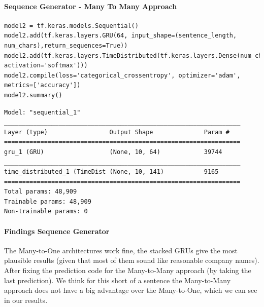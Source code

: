 \documentclass[11pt]{article}
\begin{document}
\paragraph{Sequence Generator - Many To Many Approach}
\begin{verbatim}
model2 = tf.keras.models.Sequential()
model2.add(tf.keras.layers.GRU(64, input_shape=(sentence_length, num_chars),return_sequences=True))
model2.add(tf.keras.layers.TimeDistributed(tf.keras.layers.Dense(num_chars, activation='softmax')))
model2.compile(loss='categorical_crossentropy', optimizer='adam', metrics=['accuracy'])
model2.summary()
\end{verbatim}
\begin{small}
	\begin{verbatim}
Model: "sequential_1"
_________________________________________________________________
Layer (type)                 Output Shape              Param #   
=================================================================
gru_1 (GRU)                  (None, 10, 64)            39744     
_________________________________________________________________
time_distributed_1 (TimeDist (None, 10, 141)           9165      
=================================================================
Total params: 48,909
Trainable params: 48,909
Non-trainable params: 0
	\end{verbatim}
\end{small}

\paragraph{Findings Sequence Generator}
The Many-to-One architectures work fine, the stacked GRUs give the most plausible results (given that most of them sound like reasonable company names). After fixing the prediction code for the Many-to-Many approach (by taking the last prediction). We think for this short of a sentence the Many-to-Many approach does not have a big advantage over the Many-to-One, which we can see in our results.
\end{document}
